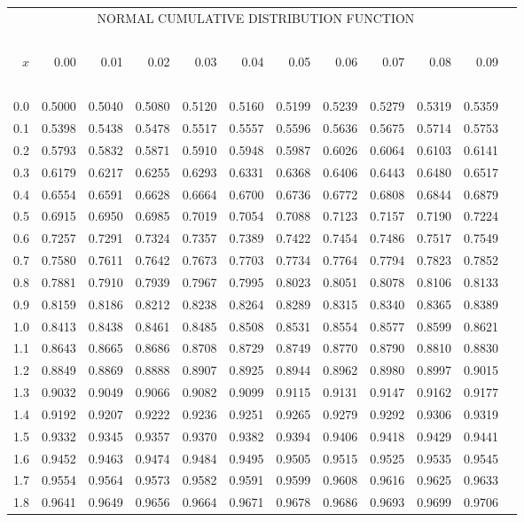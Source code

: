 \documentclass[12pt,a4paper,openany,twoside]{report}
\theoremstyle{definition}
\theoremstyle{remark}
\theoremstyle{plain}
\theoremstyle{definition}
\theoremstyle{definition}
\theoremstyle{definition}
\theoremstyle{remark}
\begin{document}
\begin{center}
\begin{tabular}{rr@{\ }r@{\ }r@{\ }r@{\ }r@{\ }r@{\ }r@{\ }r@{\ }r@{\ }r@{\ }r}
\multicolumn{11}{c}{NORMAL CUMULATIVE DISTRIBUTION FUNCTION}\\
\ \\
$x$&0.00&0.01&0.02&0.03&0.04&0.05&0.06&0.07&0.08&0.09\\
\ \\
0.0&0.5000&0.5040&0.5080&0.5120&0.5160&0.5199&0.5239&0.5279&0.5319&0.5359\\
0.1&0.5398&0.5438&0.5478&0.5517&0.5557&0.5596&0.5636&0.5675&0.5714&0.5753\\
0.2&0.5793&0.5832&0.5871&0.5910&0.5948&0.5987&0.6026&0.6064&0.6103&0.6141\\
0.3&0.6179&0.6217&0.6255&0.6293&0.6331&0.6368&0.6406&0.6443&0.6480&0.6517\\
0.4&0.6554&0.6591&0.6628&0.6664&0.6700&0.6736&0.6772&0.6808&0.6844&0.6879\\
0.5&0.6915&0.6950&0.6985&0.7019&0.7054&0.7088&0.7123&0.7157&0.7190&0.7224\\
0.6&0.7257&0.7291&0.7324&0.7357&0.7389&0.7422&0.7454&0.7486&0.7517&0.7549\\
0.7&0.7580&0.7611&0.7642&0.7673&0.7703&0.7734&0.7764&0.7794&0.7823&0.7852\\
0.8&0.7881&0.7910&0.7939&0.7967&0.7995&0.8023&0.8051&0.8078&0.8106&0.8133\\
0.9&0.8159&0.8186&0.8212&0.8238&0.8264&0.8289&0.8315&0.8340&0.8365&0.8389\\
1.0&0.8413&0.8438&0.8461&0.8485&0.8508&0.8531&0.8554&0.8577&0.8599&0.8621\\
1.1&0.8643&0.8665&0.8686&0.8708&0.8729&0.8749&0.8770&0.8790&0.8810&0.8830\\
1.2&0.8849&0.8869&0.8888&0.8907&0.8925&0.8944&0.8962&0.8980&0.8997&0.9015\\
1.3&0.9032&0.9049&0.9066&0.9082&0.9099&0.9115&0.9131&0.9147&0.9162&0.9177\\
1.4&0.9192&0.9207&0.9222&0.9236&0.9251&0.9265&0.9279&0.9292&0.9306&0.9319\\
1.5&0.9332&0.9345&0.9357&0.9370&0.9382&0.9394&0.9406&0.9418&0.9429&0.9441\\
1.6&0.9452&0.9463&0.9474&0.9484&0.9495&0.9505&0.9515&0.9525&0.9535&0.9545\\
1.7&0.9554&0.9564&0.9573&0.9582&0.9591&0.9599&0.9608&0.9616&0.9625&0.9633\\
1.8&0.9641&0.9649&0.9656&0.9664&0.9671&0.9678&0.9686&0.9693&0.9699&0.9706\\

\end{tabular}
\end{center}
\end{document}
